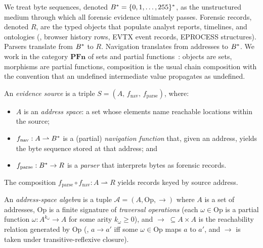 We treat byte sequences, denoted $B^{*} = \{0,1,\ldots,255\}^{*}$, as the
unstructured medium through which all forensic evidence ultimately passes.
Forensic records, denoted $R$, are the typed objects that populate analyst
reports, timelines, and ontologies (\eg{}, browser history rows, EVTX event
records, EPROCESS structures). Parsers translate from $B^{*}$ to $R$.
Navigation translates from addresses to $B^{*}$. We work in the category
$\mathbf{PFn}$ of sets and partial functions~\cite{maclane1998categories}:
objects are sets, morphisms are partial functions, composition is the usual
chain composition with the convention that an undefined intermediate value
propagates as undefined.

\begin{definition}
\label{def:source}
An \emph{evidence source} is a triple $S = (A,\, f_{\mathrm{nav}},\,
f_{\mathrm{parse}})$, where:
\begin{itemize}
    \item $A$ is an \emph{address space}: a set whose elements name reachable
    locations within the source;
    \item $f_{\mathrm{nav}} : A \rightharpoonup B^{*}$ is a (partial)
    \emph{navigation function} that, given an address, yields the byte
    sequence stored at that address; and
    \item $f_{\mathrm{parse}} : B^{*} \to R$ is a \emph{parser} that
    interprets bytes as forensic records.
\end{itemize}
The composition $f_{\mathrm{parse}} \circ f_{\mathrm{nav}} : A \rightharpoonup R$
yields records keyed by source address.
\end{definition}

\begin{definition}
\label{def:addr-algebra}
An \emph{address-space algebra} is a tuple $\mathcal{A} = (A, \mathrm{Op}, \to)$
where $A$ is a set of addresses, $\mathrm{Op}$ is a finite signature of
\emph{traversal operations} (each $\omega \in \mathrm{Op}$ is a partial
function $\omega : A^{k_\omega} \to A$ for some arity $k_\omega \geq 0$),
and $\to \;\subseteq A \times A$ is the reachability relation generated by
$\mathrm{Op}$ (\ie{}, $a \to a'$ iff some $\omega \in \mathrm{Op}$ maps $a$
to $a'$, and $\to$ is taken under transitive-reflexive closure).
\end{definition}

